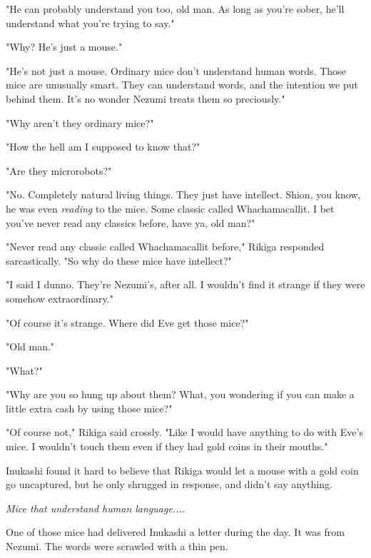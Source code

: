 "He can probably understand you too, old man. As long as you're sober,
he'll understand what you're trying to say."

"Why? He's just a mouse."

"He's not just a mouse. Ordinary mice don't understand human words.
Those mice are unusually smart. They can understand words, and the
intention we put behind them. It's no wonder Nezumi treats them so
preciously."

"Why aren't they ordinary mice?"

"How the hell am I supposed to know that?"

"Are they microrobots?"

"No. Completely natural living things. They just have intellect. Shion,
you know, he was even \emph{reading} to the mice. Some classic called
Whachamacallit. I bet you've never read any classics before, have ya,
old man?"

"Never read any classic called Whachamacallit before," Rikiga responded
sarcastically. "So why do these mice have intellect?"

"I said I dunno. They're Nezumi's, after all. I wouldn't find it strange
if they were somehow extraordinary."

"Of course it's strange. Where did Eve get those mice?"

"Old man."

"What?"

"Why are you so hung up about them? What, you wondering if you can make
a little extra cash by using those mice?"

"Of course not," Rikiga said crossly. "Like I would have anything to do
with Eve's mice. I wouldn't touch them even if they had gold coins in
their mouths."

Inukashi found it hard to believe that Rikiga would let a mouse with a
gold coin go uncaptured, but he only shrugged in response, and didn't
say anything.

\emph{Mice that understand human language....}

One of those mice had delivered Inukashi a letter during the day. It was
from Nezumi. The words were scrawled with a thin pen.


